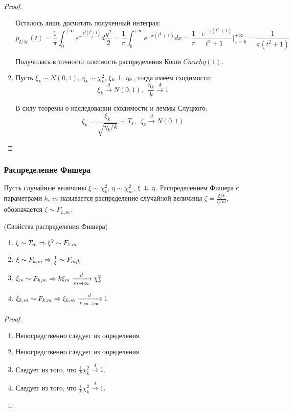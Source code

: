 \begin{proof}
\begin{enumerate}
        Осталось лишь досчитать полученный интеграл:
        \[
            p_{\xi / |\eta|}(t) = \frac{1}{\pi} \int_0^{+\infty} e^{-\frac{y^2(t^2+1)}{2}} d\frac{y^2}{2} = \frac{1}{\pi} \int_0^{+\infty} e^{-x(t^2+1)} dx = \frac{1}{\pi} \frac{-e^{-x(t^2+1)}}{t^2+1} \Bigr|_{x = 0}^{+\infty} = \frac{1}{\pi (t^2+1)}
        \]

        Получилась в точности плотность распределения Коши $Cauchy(1)$.

        \item Пусть $\xi_k \sim N(0, 1)$, $\eta_k \sim \chi^2_k$, $\xi_k \perp\mkern-9.5mu\perp \eta_k$, тогда имеем сходимости:
        \[
            \xi_k \xrightarrow{d} N(0, 1),\ \ \frac{\eta_k}{k} \xrightarrow{d} 1
        \]

        В силу теоремы о наследовании сходимости и леммы Слуцкого:
        \[
            \zeta_k = \frac{\xi_k}{\sqrt{\eta_k / k}} \sim T_k,\ \ \zeta_k \xrightarrow{d} N(0, 1)
        \]
    \end{enumerate}
\end{proof}

\subsubsection{Распределение Фишера}

\begin{definition}
    Пусть случайные величины $\xi \sim \chi^2_k$, $\eta \sim \chi^2_m$, $\xi \perp\mkern-9.5mu\perp \eta$. Распределением Фишера с параметрами $k$, $m$ называется распределение случайной величины $\zeta = \frac{\xi/k}{\eta/m}$, обозначается $\zeta \sim F_{k, m}$.
\end{definition}

\begin{proposition} (Свойства распределения Фишера)
    \begin{enumerate}
        \item $\xi \sim T_m \Rightarrow \xi^2 \sim F_{1, m}$
        \item $\xi \sim F_{k, m} \Rightarrow \frac{1}{\xi} \sim F_{m, k}$
        \item $\xi_m \sim F_{k, m} \Rightarrow k \xi_m \xrightarrow[m \to \infty]{d} \chi^2_k$
        \item $\xi_{k, m} \sim F_{k, m} \Rightarrow \xi_{k, m} \xrightarrow[k, m \to \infty]{d} 1$
    \end{enumerate}
\end{proposition}

\begin{proof}~
    \begin{enumerate}
        \item Непосредственно следует из определения.
        \item Непосредственно следует из определения.
        \item Следует из того, что $\frac{1}{k} \chi^2_k \xrightarrow{d} 1$.
        \item Следует из того, что $\frac{1}{k} \chi^2_k \xrightarrow{d} 1$.
    \end{enumerate}
\end{proof}

